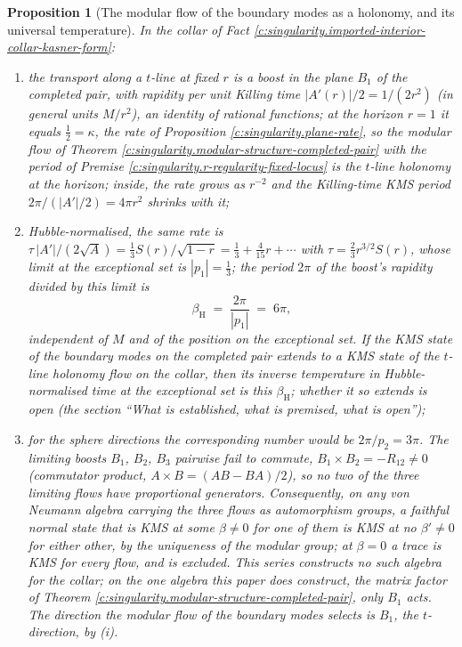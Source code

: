 \documentclass[11pt]{article}
\newtheorem{proposition}[theorem]{Proposition}
\theoremstyle{definition}
\theoremstyle{plain}
\newcommand{\changedmark}[2]{\marginpar{\raggedright\scriptsize\color{#1}#2}}
\begin{document}
\begin{proposition}[The modular flow of the boundary modes as a holonomy, and its universal temperature]\label{c:singularity.modular-flow-boundary-modes-holonomy-universal}
\changedmark{gray}{reworded}
In the collar of Fact \ref{c:singularity.imported-interior-collar-kasner-form}:
\begin{enumerate}
\item[(i)] the transport along a $t$-line at fixed $r$ is a boost in the plane $B_1$ of the completed pair, with rapidity per unit Killing time $|A'(r)|/2 = 1/(2r^2)$ (in general units $M/r^2$), an identity of rational functions; at the horizon $r = 1$ it equals $\tfrac12 = \kappa$, the rate of Proposition \ref{c:singularity.plane-rate}, so the modular flow of Theorem \ref{c:singularity.modular-structure-completed-pair} with the period of Premise \ref{c:singularity.r-regularity-fixed-locus} is the $t$-line holonomy at the horizon; inside, the rate grows as $r^{-2}$ and the Killing-time KMS period $2\pi/(|A'|/2) = 4\pi r^2$ shrinks with it;
\item[(ii)] Hubble-normalised, the same rate is $\tau\,|A'|/(2\sqrt{A}) = \tfrac13 S(r)/\sqrt{1 - r} = \tfrac13 + \tfrac{4}{15}r + \cdots$ with $\tau = \tfrac23 r^{3/2} S(r)$, whose limit at the exceptional set is $|p_1| = \tfrac13$; the period $2\pi$ of the boost's rapidity divided by this limit is
\[
\beta_{\mathrm{H}} \;=\; \frac{2\pi}{|p_1|} \;=\; 6\pi ,
\]
independent of $M$ and of the position on the exceptional set. If the KMS state of the boundary modes on the completed pair extends to a KMS state of the $t$-line holonomy flow on the collar, then its inverse temperature in Hubble-normalised time at the exceptional set is this $\beta_{\mathrm{H}}$; whether it so extends is open (the section ``What is established, what is premised, what is open'');
\item[(iii)] for the sphere directions the corresponding number would be $2\pi/p_2 = 3\pi$. The limiting boosts $B_1$, $B_2$, $B_3$ pairwise fail to commute, $B_1 \times B_2 = -R_{12} \neq 0$ (commutator product, $A \times B = (AB - BA)/2$), so no two of the three limiting flows have proportional generators. Consequently, on any von Neumann algebra carrying the three flows as automorphism groups, a faithful normal state that is KMS at some $\beta \neq 0$ for one of them is KMS at no $\beta' \neq 0$ for either other, by the uniqueness of the modular group; at $\beta = 0$ a trace is KMS for every flow, and is excluded. This series constructs no such algebra for the collar; on the one algebra this paper does construct, the matrix factor of Theorem \ref{c:singularity.modular-structure-completed-pair}, only $B_1$ acts. The direction the modular flow of the boundary modes selects is $B_1$, the $t$-direction, by (i).
\end{enumerate}
\end{proposition}
\end{document}
